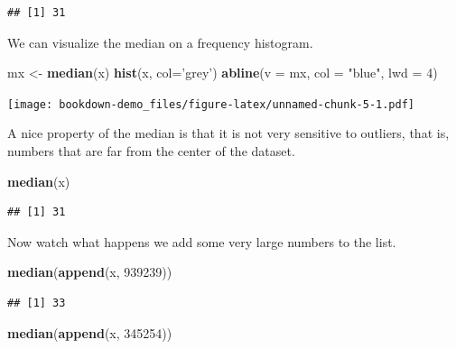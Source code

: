 \documentclass[]{book}
\newenvironment{Shaded}{\begin{snugshade}}{\end{snugshade}}
\newcommand{\DataTypeTok}[1]{\textcolor[rgb]{0.13,0.29,0.53}{#1}}
\newcommand{\DecValTok}[1]{\textcolor[rgb]{0.00,0.00,0.81}{#1}}
\newcommand{\KeywordTok}[1]{\textcolor[rgb]{0.13,0.29,0.53}{\textbf{#1}}}
\newcommand{\NormalTok}[1]{#1}
\newcommand{\StringTok}[1]{\textcolor[rgb]{0.31,0.60,0.02}{#1}}
\begin{document}
\begin{verbatim}
## [1] 31
\end{verbatim}

We can visualize the median on a frequency histogram.

\begin{Shaded}
\begin{Highlighting}[]
\NormalTok{mx <-}\StringTok{ }\KeywordTok{median}\NormalTok{(x)}
\KeywordTok{hist}\NormalTok{(x, }\DataTypeTok{col=}\StringTok{'grey'}\NormalTok{)}
\KeywordTok{abline}\NormalTok{(}\DataTypeTok{v =}\NormalTok{ mx, }\DataTypeTok{col =} \StringTok{"blue"}\NormalTok{, }\DataTypeTok{lwd =} \DecValTok{4}\NormalTok{)}
\end{Highlighting}
\end{Shaded}

\texttt{[image: bookdown-demo\_files/figure-latex/unnamed-chunk-5-1.pdf]}

A nice property of the median is that it is not very sensitive to outliers, that is, numbers that are far from the center of the dataset.

\begin{Shaded}
\begin{Highlighting}[]
\KeywordTok{median}\NormalTok{(x)}
\end{Highlighting}
\end{Shaded}

\begin{verbatim}
## [1] 31
\end{verbatim}

Now watch what happens we add some very large numbers to the list.

\begin{Shaded}
\begin{Highlighting}[]
\KeywordTok{median}\NormalTok{(}\KeywordTok{append}\NormalTok{(x, }\DecValTok{939239}\NormalTok{))}
\end{Highlighting}
\end{Shaded}

\begin{verbatim}
## [1] 33
\end{verbatim}

\begin{Shaded}
\begin{Highlighting}[]
\KeywordTok{median}\NormalTok{(}\KeywordTok{append}\NormalTok{(x, }\DecValTok{345254}\NormalTok{))}
\end{Highlighting}
\end{Shaded}
\end{document}
